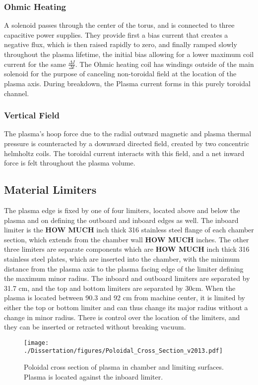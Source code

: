 \subsubsection{Ohmic Heating}
A solenoid passes through the center of the torus, and is connected to three capacitive power supplies.  They provide first a bias current that creates a negative flux, which is then raised rapidly to zero, and finally ramped slowly throughout the plasma lifetime, the initial bias allowing for a lower maximum coil current for the same $\frac{\Delta I}{\Delta t}$.  The Ohmic heating coil has windings outside of the main solenoid for the purpose of canceling non-toroidal field at the location of the plasma axis.  During breakdown, the Plasma current forms in this purely toroidal channel.
\subsubsection{Vertical Field}
The plasma's hoop force due to the radial outward magnetic and plasma thermal pressure is counteracted by a downward directed field, created by two concentric helmholtz coils.  The toroidal current interacts with this field, and a net inward force is felt throughout the plasma volume.
\subsection{Material Limiters}
The plasma edge is fixed by one of four limiters, located above and below the plasma and on defining the outboard and inboard edges as well.  The inboard limiter is the \textbf{HOW MUCH} inch thick 316 stainless steel flange of each chamber section, which extends from the chamber wall \textbf{HOW MUCH} inches.  The other three limiters are separate components which are \textbf{HOW MUCH} inch thick 316 stainless steel plates, which are inserted into the chamber, with the minimum distance from the plasma axis to the plasma facing edge of the limiter defining the maximum minor radius.  The inboard and outboard limiters are separated by 31.7 cm, and the top and bottom limiters are separated by 30cm.  When the plasma is located between 90.3 and 92 cm from machine center, it is limited by either the top or bottom limiter and can thus change its major radius without a change in minor radius.  There is control over the location of the limiters, and they can be inserted or retracted without breaking vacuum.

\begin{figure}
\texttt{[image: ./Dissertation/figures/Poloidal\_Cross\_Section\_v2013.pdf]}\begin{flushleft}
\caption{Poloidal cross section of plasma in chamber and limiting surfaces.  Plasma is located against the inboard limiter.}
\end{flushleft}
\label{original_limiters}
\end{figure}

